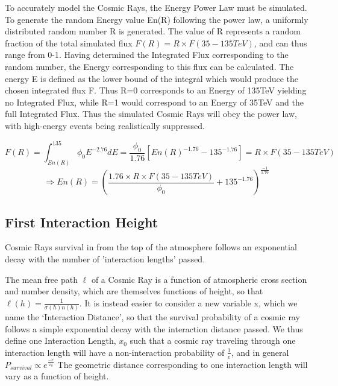 \documentclass[11pt]{article}
\begin{document}
To accurately model the Cosmic Rays, the Energy Power Law must be simulated. To generate the random Energy value En(R) following the power law, a uniformly distributed random number R is generated. The value of R represents a random fraction of the total simulated flux $ F(R) = R \times F(35-135TeV) $, and can thus range from 0-1. Having determined the Integrated Flux corresponding to the random number, the Energy corresponding to this flux can be calculated. The energy E is defined as the lower bound of the integral which would produce the chosen integrated flux F. Thus R=0 corresponds to an Energy of 135TeV yielding no Integrated Flux, while R=1 would correspond to an Energy of 35TeV and the full Integrated Flux. Thus the simulated Cosmic Rays will obey the power law, with high-energy events being realistically suppressed.

\[ F(R) = \int_{En(R)}^{135} \phi_{0} E^{-2.76} dE =\frac{\phi_{0}}{1.76}[En(R)^{-1.76} - 135^{-1.76}]= R \times F(35-135TeV)\] \[\Longrightarrow  En(R) = (\frac{1.76\times R \times F(35-135TeV)}{\phi_{0}} +135^{-1.76})^{\frac{-1}{1.76}} \]

\subsection{First Interaction Height}
Cosmic Rays survival in from the top of the atmosphere follows an exponential decay with the number of 'interaction lengths' passed. 

The mean free path $\ell$ of a Cosmic Ray is a function of atmospheric cross section and number density, which are themselves functions of  height, so that $\ell(h) = \frac{1}{\sigma(h) n(h)}$. It is instead easier to consider a new variable x, which we name the \textquoteleft Interaction Distance', so that the survival probability of a cosmic ray follows a simple exponential decay with the interaction distance passed. We thus define one Interaction Length, $x_{0}$ such that a cosmic ray traveling through one interaction length will have a non-interaction probability of $\frac{1}{e}$, and in general $P_{survival} \propto e^{\frac{-x}{x_{0}}}$ The geometric distance corresponding to one interaction length will vary as a function of height.
\end{document}
